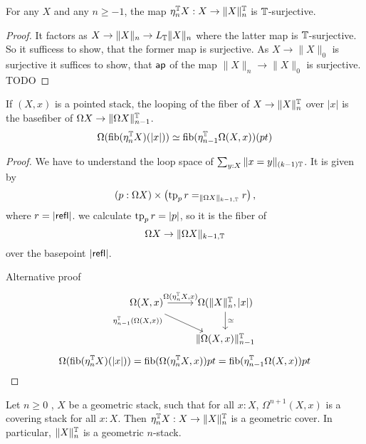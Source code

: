 \begin{lemma}
	For any $X$ and any $n \ge -1$, the map $\eta_n^{\mathbb{T}} X : X \to \|X\|_n^{\mathbb{T}}$ is $\mathbb{T}$-surjective.
\end{lemma}
\begin{proof}
	It factors as $X \to \|X\|_n \to L_{\mathbb{T}} \|X\|_n$ where the latter map is $\mathbb{T}$-surjective. So it sufficess to show, that the former map is surjective. As $X \to \|X\|_0$ is surjective it suffices to show, that $\mathsf{ap}$ of the map $\|X\|_n \to \|X\|_0$ is surjective. TODO %
\end{proof}
\begin{lemma}{\label{lemma:loopOfFiber}}
	If $(X,x)$ is a pointed stack, the looping of the fiber of $X \to \|X\|_{n}^{\mathbb{T}}$ over $|x|$ is the basefiber of $\Omega X \to \|\Omega X\|_{n-1}^{\mathbb{T}}$.
	\[
	\Omega (\operatorname{fib}(\eta_n^{\mathbb{T}} X)(|x|)) \simeq \operatorname{fib} (\eta_{n-1}^{\mathbb{T}} \Omega (X,x))(pt)
	\]
\end{lemma}
\begin{proof}
	We have to understand the loop space of $\sum_{y : X} \| x = y\|_{(k-1)\mathbb{T}}$. It is given by
	\[(p : \Omega X) \times \left(\operatorname{tp}_p r =_{\|\Omega X\|_{k-1,\mathbb{T}}} r  \right),\]
	where $ r= |\mathsf{refl}|$.
	we calculate $\operatorname{tp}_p r = |p|$, so it is the fiber of 
	\[
	\Omega X  \to \|\Omega X \|_{k-1, \mathbb{T}}
	\]
	over the basepoint $|\mathsf{refl}|$.
	
	Alternative proof
\[\begin{tikzcd}
	{\Omega (X , x)} & {\Omega (\|X\|_n^\bT , |x|) } \\
	& {\|\Omega (X , x)\|_{n-1}^\bT}
	\arrow["{	\Omega (\eta_n^\bT X , x)}", from=1-1, to=1-2]
	\arrow["{\eta_{n-1}^\bT (\Omega (X,x))}"'{pos=0}, shift right, from=1-1, to=2-2]
	\arrow["{\simeq }", from=1-2, to=2-2]
\end{tikzcd}\]
	\[
		\Omega (\operatorname{fib}(\eta_n^{\mathbb{T}} X)(|x|)) = \operatorname{fib} (\Omega (\eta_n^{\mathbb{T}} X ,x)) pt = \operatorname{fib} (\eta_{n-1}^{\mathbb{T}} \Omega (X ,x)) pt
	\]
\end{proof}
\begin{prop}
	Let $n \ge 0$ , $X$ be a geometric stack, such that for all $x : X$, $\Omega^{n+1} (X , x)$ is a covering stack for all $x : X$. Then $\eta_n^{\mathbb{T}} X : X \to \|X\|_n^{\mathbb{T}}$ is a geometric cover. In particular, $\|X\|_n^{\mathbb{T}}$ is a geometric $n$-stack.
\end{prop}

